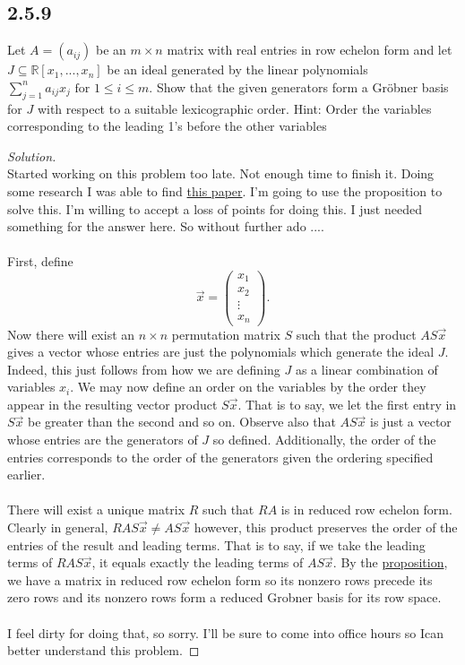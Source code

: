 \documentclass[]{article}
\newcommand\<{\langle}
\renewcommand\>{\rangle}
\newcommand{\RR}{\ensuremath{\mathbb{R}}}
\newenvironment{solution}
{
	\begin{proof}[Solution] \text{ }
		\\
	}
	{
	\end{proof}
}
\begin{document}
\subsection*{2.5.9} Let $A = (a_{ij})$ be an $m \times n$ matrix with real entries in row echelon form and let $J \subseteq \RR[x_1 , . . . , x_n ]$ be an ideal generated by the linear polynomials $\sum_{j=1}^{n}  a_{ij} x_j \text{ for } 1 \leq i \leq m$.
Show that the given generators form a Gröbner basis for $J$ with respect to a suitable
lexicographic order. Hint: Order the variables corresponding to the leading 1’s before
the other variables
\begin{solution}
	Started working on this problem too late. Not enough time to finish it. Doing some research I was able to find \href{https://dept.math.lsa.umich.edu/~hochster/615W07/L01.17.pdf}{this paper}. I'm going to use the proposition to solve this. I'm willing to accept a loss of points for doing this. I just needed something for the answer here. So without further ado ....
	\\
	\\
	First, define
	$$
		\vec{x} = \begin{pmatrix}
			x_1 \\
			x_2 \\
			\vdots \\
			x_n
		\end{pmatrix}.
	$$
	Now there will exist an $n\times n$ permutation matrix $S$ such that the product
	$
		AS\vec{x} 
	$
	gives a vector whose entries are just the polynomials which generate the ideal $J$. Indeed, this just follows from how we are defining $J$ as a linear combination of variables $x_i$. We may now define an order on the variables by the order they appear in the resulting vector product $S\vec{x}$. That is to say, we let the first entry in $S\vec{x}$ be greater than the second and so on. Observe also that $AS\vec{x}$ is just a vector whose entries are the generators of $J$ so defined. Additionally, the order of the entries corresponds to the order of the generators given the ordering specified earlier.
	\\
	\\
	There will exist a unique matrix $R$ such that $RA$ is in reduced row echelon form. Clearly in general, $RAS\vec{x} \neq AS\vec{x}$ however, this product preserves the order of the entries of the result and leading terms. That is to say, if we take the leading terms of $RAS\vec{x}$, it equals exactly the leading terms of $AS\vec{x}$. By the \href{https://dept.math.lsa.umich.edu/~hochster/615W07/L01.17.pdf}{proposition}, we have a matrix in reduced row echelon form so its nonzero rows precede its zero rows and its nonzero rows form a reduced Grobner basis for its row space.
	\\
	\\
	I feel dirty for doing that, so sorry. I'll be sure to come into office hours so  Ican better understand this problem.


\end{solution}
\end{document}
